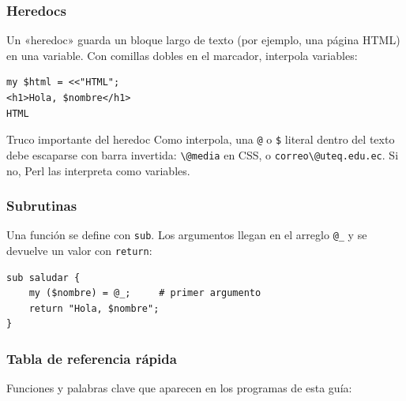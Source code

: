 \documentclass[11pt]{article}
\begin{document}
\subsubsection{Heredocs}
Un «heredoc» guarda un bloque largo de texto (por ejemplo, una página HTML) en una variable. Con comillas dobles en el marcador, interpola variables:

\begin{cajacodigo}[Heredoc]
\begin{lstlisting}[style=perl]
my $html = <<"HTML";
<h1>Hola, $nombre</h1>
HTML
\end{lstlisting}
\end{cajacodigo}
\vspace{2pt}
\begin{cajatip}{Truco importante del heredoc}
Como interpola, una \texttt{@} o \texttt{\$} literal dentro del texto debe escaparse con barra invertida: \texttt{\textbackslash{}@media} en CSS, o \texttt{correo\textbackslash{}@uteq.edu.ec}. Si no, Perl las interpreta como variables.\par
\end{cajatip}
\subsubsection{Subrutinas}
Una función se define con \texttt{sub}. Los argumentos llegan en el arreglo \texttt{@\_} y se devuelve un valor con \texttt{return}:

\begin{cajacodigo}[Subrutina]
\begin{lstlisting}[style=perl]
sub saludar {
    my ($nombre) = @_;     # primer argumento
    return "Hola, $nombre";
}
\end{lstlisting}
\end{cajacodigo}
\vspace{2pt}
\subsubsection{Tabla de referencia rápida}
Funciones y palabras clave que aparecen en los programas de esta guía:
\end{document}
